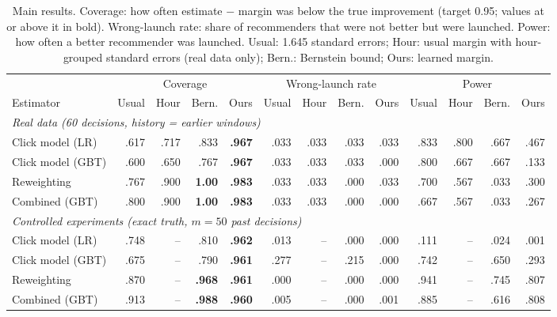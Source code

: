 \begin{table}[t]
\centering
\caption{Main results. Coverage: how often estimate $-$ margin was below the true improvement (target 0.95; values at or above it in bold). Wrong-launch rate: share of recommenders that were not better but were launched. Power: how often a better recommender was launched. Usual: 1.645 standard errors; Hour: usual margin with hour-grouped standard errors (real data only); Bern.: Bernstein bound; Ours: learned margin.}
\label{tab:results}
\small
\setlength{\tabcolsep}{4.5pt}
\begin{tabular}{lrrrrrrrrrrrr}
\toprule
& \multicolumn{4}{c}{Coverage} & \multicolumn{4}{c}{Wrong-launch rate} & \multicolumn{4}{c}{Power} \\
\cmidrule(lr){2-5}\cmidrule(lr){6-9}\cmidrule(lr){10-13}
Estimator & Usual & Hour & Bern. & Ours & Usual & Hour & Bern. & Ours & Usual & Hour & Bern. & Ours \\
\midrule
\multicolumn{13}{l}{\emph{Real data (60 decisions, history = earlier windows)}} \\
Click model (LR) & .617 & .717 & .833 & \textbf{.967} & .033 & .033 & .033 & .033 & .833 & .800 & .667 & .467 \\
Click model (GBT) & .600 & .650 & .767 & \textbf{.967} & .033 & .033 & .033 & .000 & .800 & .667 & .667 & .133 \\
Reweighting & .767 & .900 & \textbf{1.00} & \textbf{.983} & .033 & .033 & .000 & .033 & .700 & .567 & .033 & .300 \\
Combined (GBT) & .800 & .900 & \textbf{1.00} & \textbf{.983} & .033 & .033 & .000 & .000 & .667 & .567 & .033 & .267 \\
\midrule
\multicolumn{13}{l}{\emph{Controlled experiments (exact truth, $m=50$ past decisions)}} \\
Click model (LR) & .748 & -- & .810 & \textbf{.962} & .013 & -- & .000 & .000 & .111 & -- & .024 & .001 \\
Click model (GBT) & .675 & -- & .790 & \textbf{.961} & .277 & -- & .215 & .000 & .742 & -- & .650 & .293 \\
Reweighting & .870 & -- & \textbf{.968} & \textbf{.961} & .000 & -- & .000 & .000 & .941 & -- & .745 & .807 \\
Combined (GBT) & .913 & -- & \textbf{.988} & \textbf{.960} & .005 & -- & .000 & .001 & .885 & -- & .616 & .808 \\
\bottomrule
\end{tabular}
\end{table}
